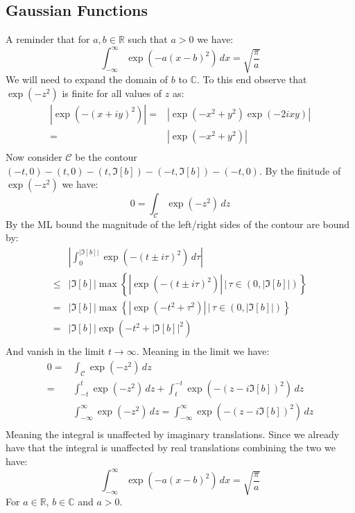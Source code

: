 \subsection{Gaussian Functions}
A reminder that for $a,b \in \mathbb{R}$ such that $a > 0$ we have:
\[\int_{-\infty}^{\infty}\exp(-a(x-b)^2)\,dx = \sqrt{\frac{\pi}{a}}\]
We will need to expand the domain of $b$ to $\mathbb{{C}}$.
To this end observe that $\exp(-z^2)$ is finite for all values of $z$ as:
\begin{equation*}
\begin{aligned}
	|\exp(-(x+iy)^2)| =& |\exp(-x^2+y^2)\exp(-2ixy)|\\
	=& |\exp(-x^2+y^2)| \\
\end{aligned}
\end{equation*}
Now consider $\mathcal{C}$ be the contour $(-t,0)-(t,0)-(t,\Im[b])-(-t,\Im[b])-(-t,0)$.
By the finitude of $\exp(-z^2)$ we have:
\[0 = \int_\mathcal{C}\exp(-z^2)\,dz \]
By the ML bound the magnitude of the left/right sides of the contour are bound by:
\begin{equation*}
\begin{aligned}
	&\left|\int_{0}^{|\Im[b]|}\exp(-(t\pm i\tau)^2)\,d\tau\right|\\
	\leq&|\Im[b]|\max\left\{|\exp(-(t\pm i\tau)^2)|\,\bigg|\,\tau \in (0,|\Im[b]|)\right\}\\
	=&|\Im[b]|\max\left\{|\exp(-t^2 +\tau^2)|\,\bigg|\,\tau \in (0,|\Im[b]|)\right\}\\
	=&|\Im[b]|\exp(-t^2 +|\Im[b]|^2)\\
\end{aligned}
\end{equation*}
And vanish in the limit $t\rightarrow \infty$.
Meaning in the limit we have:
\begin{equation*}
\begin{aligned}
	0 =& \int_\mathcal{C}\exp(-z^2)\,dz \\
	=& \int_{-t}^{t}\exp(-z^2)\,dz + \int_{t}^{-t}\exp(-(z-i\Im[b])^2)\,dz \\
	&\int_{-\infty}^{\infty}\exp(-z^2)\,dz = \int_{-\infty}^{\infty}\exp(-(z-i\Im[b])^2)\,dz \\
\end{aligned}
\end{equation*}
Meaning the integral is unaffected by imaginary translations.
Since we already have that the integral is unaffected by real translations combining the two we have:
\[\int_{-\infty}^{\infty}\exp(-a(x-b)^2)\,dx = \sqrt{\frac{\pi}{a}}\]
For $a \in \mathbb{R}$, $b \in \mathbb{C}$ and $a > 0$.
\\

